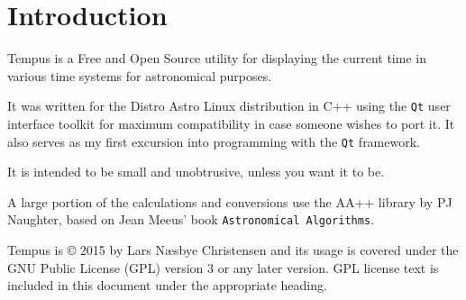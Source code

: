\section{Introduction}
Tempus is a Free and Open Source utility for displaying the current time in various time systems for astronomical purposes.

It was written for the Distro Astro Linux distribution in C++ using the \texttt{Qt} user interface toolkit for maximum compatibility in case someone wishes to port it.
It also serves as my first excursion into programming with the \texttt{Qt} framework.

It is intended to be small and unobtrusive, unless you want it to be.

A large portion of the calculations and conversions use the AA++ library by PJ Naughter, based on Jean Meeus' book \texttt{Astronomical Algorithms}.

Tempus is {\copyright} 2015 by Lars N{\ae}sbye Christensen and its usage is covered under the GNU Public License (GPL) version 3 or any later version. GPL license text is included in this document under the appropriate heading.

